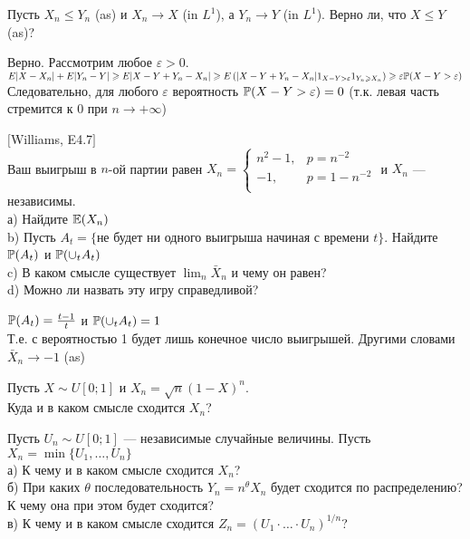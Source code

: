 \begin{problem}
Пусть $X_{n}\le Y_{n}$ (as) и $X_{n}\rightarrow X$ (in $L^{1}$), а
$Y_{n}\rightarrow Y$ (in $L^{1}$). Верно ли, что $X\le Y$ (as)? 
\end{problem} 
\begin{solution} 

Верно. Рассмотрим любое $\varepsilon>0$. \\
$E|X-X_{n}|+E|Y_{n}-Y|\ge E|X-Y+Y_{n}-X_{n}|\ge E\left(
|X-Y+Y_{n}-X_{n}| 1_{X-Y>\varepsilon}1_{Y_{n}\ge X_{n}}\right)\ge
\varepsilon \P(X-Y>\varepsilon)$ \\
Следовательно, для любого $\varepsilon$ вероятность
$\P(X-Y>\varepsilon)=0$ (т.к. левая часть стремится к 0 при
$n\rightarrow +\infty$) 
\end{solution}

\begin{problem}
$[$Williams, E4.7$]$ \\
Ваш выигрыш в $n$-ой партии равен $X_{n}=
\begin{cases}
  n^{2}-1, & p=n^{-2} \\
  -1, & p=1-n^{-2} \\
\end{cases}$ и $X_{n}$ --- независимы. \\
а) Найдите $\E(X_{n})$ \\
b) Пусть $A_{t}=\{$не будет ни одного выигрыша начиная с времени
$t\}$. Найдите $\P(A_{t})$ и $\P(\cup_{t} A_{t})$ \\
c) В каком смысле существует $\lim_{n}\bar{X}_{n}$ и чему он
равен? \\
d) Можно ли назвать эту игру справедливой? 
\end{problem} 
\begin{solution} 


$\P(A_{t})=\frac{t-1}{t}$ и $\P(\cup_{t} A_{t})=1$ \\
Т.е. с вероятностью 1 будет лишь конечное число выигрышей. Другими
словами $\bar{X}_{n} \rightarrow -1$ (as) 
\end{solution}

\begin{problem}
Пусть $X\sim U[0;1]$ и $X_{n}=\sqrt{n}(1-X)^{n}$. \\
Куда и в каком смысле сходится $X_{n}$? 
\end{problem} 
\begin{solution} 

\end{solution}

\begin{problem}
Пусть $U_{n}\sim U[0;1]$ --- независимые случайные величины. Пусть
$X_{n}=\min\{U_{1},\ldots,U_{n}\}$ \\
а) К чему и в каком смысле сходится $X_{n}$? \\
б) При каких $\theta$ последовательность $Y_{n}=n^{\theta}X_{n}$
будет сходится по распределению? К чему она при этом будет
сходится? \\
в) К чему и в каком смысле сходится $Z_{n}=(U_{1}\cdot\ldots\cdot U_{n})^{1/n}$? 
\end{problem} 
\begin{solution} 

\end{solution}

